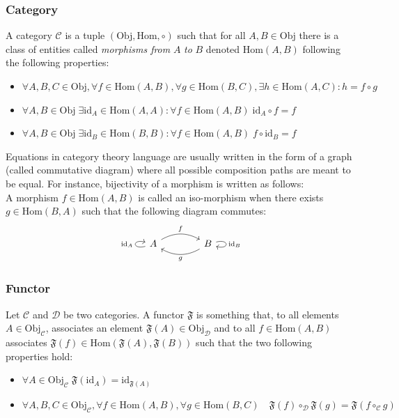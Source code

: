 \documentclass[a4paper,11pt]{article}
\numberwithin{equation}{section}
\theoremstyle{definition}
\begin{document}
    \subsubsection{Category}
    A category $\mathcal{C}$ is a tuple $(\mathrm{Obj},\mathrm{Hom},\circ)$ such that for all $A,B \in \mathrm{Obj}$ there is a class of entities called \emph{morphisms from} $A$ \emph{to} $B$ denoted $\mathrm{Hom}(A,B)$ following the following properties:
    \begin{itemize}
        \item $\forall A, B, C \in \mathrm{Obj}, \forall f\in \mathrm{Hom}(A,B), \forall g\in \mathrm{Hom}(B,C), \exists h \in \mathrm{Hom} (A,C) : h=f\circ g$
        \item $\forall A,B \in \mathrm{Obj} \; \exists \mathrm{id}_A \in \mathrm{Hom}(A,A): \forall f \in \mathrm{Hom}(A,B) \; \mathrm{id}_A\circ f=f$
        \item $\forall A,B \in \mathrm{Obj} \; \exists \mathrm{id}_B \in \mathrm{Hom}(B,B): \forall f \in \mathrm{Hom}(A,B) \; f\circ \mathrm{id}_B=f$
    \end{itemize}
    Equations in category theory language are usually written in the form of a graph (called commutative diagram) where all possible composition paths are meant to be equal. For instance, bijectivity of a morphism is written as follows:\\
    A morphism $f \in \mathrm{Hom}(A,B)$ is called an iso-morphism when there exists $g \in \mathrm{Hom}(B,A)$ such that the following diagram commutes:
    $$\begin{tikzcd}[column sep=4em,row sep=4em,/tikz/column 2/.style={column sep=2em}]
\arrow[loop left]{l}{\mathrm{id}_A} A \arrow[r,bend left,"f"]
    & B \arrow[l,bend left,"g"] \arrow[loop right]{r}{\mathrm{id}_B}
\end{tikzcd}$$

\subsubsection{Functor}
    Let $\mathcal{C}$ and $\mathcal{D}$ be two categories. A functor $\mathfrak{F}$ is something that, to all elements $A\in\mathrm{Obj}_\mathcal{C}$, associates an element $\mathfrak{F}(A)\in\mathrm{Obj}_\mathcal{D}$ and to all $f \in \mathrm{Hom}(A,B)$ associates $\mathfrak{F}(f)\in\mathrm{Hom}(\mathfrak{F}(A),\mathfrak{F}(B))$ such that the two following properties hold:
    \begin{itemize}
        \item $\forall A \in \mathrm{Obj}_\mathcal{C}\; \mathfrak{F}(\mathrm{id}_A)=\mathrm{id}_{\mathfrak{F}(A)}$
        \item $\forall A,B,C \in \mathrm{Obj}_\mathcal{C}, \forall f \in \mathrm{Hom}(A,B), \forall g \in \mathrm{Hom}(B,C)\quad \mathfrak{F}(f)\circ_\mathcal{D}\mathfrak{F}(g)=\mathfrak{F}(f\circ_\mathcal{C}g)$
    \end{itemize}
\end{document}
